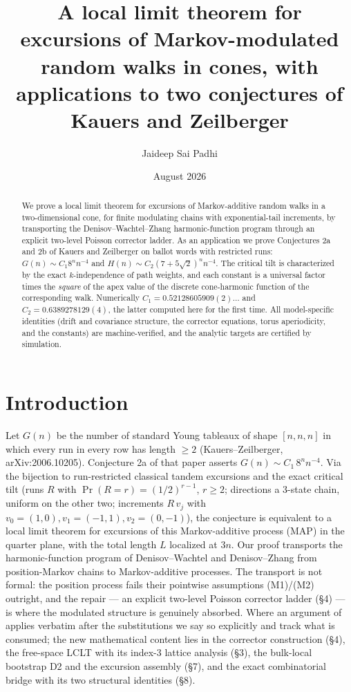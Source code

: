 \documentclass[11pt]{article}
\title{A local limit theorem for excursions of Markov-modulated random walks in cones, with applications to two conjectures of Kauers and Zeilberger}
\author{Jaideep Sai Padhi}
\date{August 2026}
\begin{document}
\maketitle
\begin{abstract}
We prove a local limit theorem for excursions of Markov-additive random walks in a
two-dimensional cone, for finite modulating chains with exponential-tail increments, by
transporting the Denisov--Wachtel--Zhang harmonic-function program through an explicit
two-level Poisson corrector ladder. As an application we prove Conjectures 2a and 2b of
Kauers and Zeilberger on ballot words with restricted runs: $G(n)\sim C_1 8^n n^{-4}$ and
$H(n)\sim C_2(7+5\sqrt2)^n n^{-4}$. The critical tilt is characterized by the exact
$k$-independence of path weights, and each constant is a universal factor times the
\emph{square} of the apex value of the discrete cone-harmonic function of the
corresponding walk. Numerically $C_1=0.52128605909(2)\ldots$ and $C_2=0.6389278129(4)$, the
latter computed here for the first time. All model-specific identities (drift and
covariance structure, the corrector equations, torus aperiodicity, and the constants) are
machine-verified, and the analytic targets are certified by simulation.
\end{abstract}

\section{Introduction}
Let $G(n)$ be the number of standard Young tableaux of shape $[n,n,n]$ in which every run
in every row has length $\ge2$ (Kauers--Zeilberger, arXiv:2006.10205). Conjecture 2a of that
paper asserts $G(n)\sim C_1\,8^n n^{-4}$. Via the bijection to run-restricted classical
tandem excursions and the exact critical tilt (runs $R$ with $\Pr(R=r)=(1/2)^{r-1}$, $r\ge2$;
directions a 3-state chain, uniform on the other two; increments $R\,v_j$ with
$v_0=(1,0),v_1=(-1,1),v_2=(0,-1)$), the conjecture is equivalent to a local limit theorem
for excursions of this Markov-additive process (MAP) in the quarter plane, with the total
length $L$ localized at $3n$. Our proof transports the harmonic-function program of Denisov--Wachtel \cite{DW} and
Denisov--Zhang \cite{DZ} from position-Markov chains to Markov-additive processes. The
transport is not formal: the position process fails their pointwise assumptions
(M1)/(M2) outright, and the repair --- an explicit two-level Poisson corrector ladder
(\S4) --- is where the modulated structure is genuinely absorbed. Where an argument of
\cite{DZ} applies verbatim after the substitutions we say so explicitly and track what is
consumed; the new mathematical content lies in the corrector construction (\S4), the
free-space LCLT with its index-3 lattice analysis (\S3), the bulk-local bootstrap D2 and
the excursion assembly (\S7), and the exact combinatorial bridge with its two structural
identities (\S8).
\end{document}
